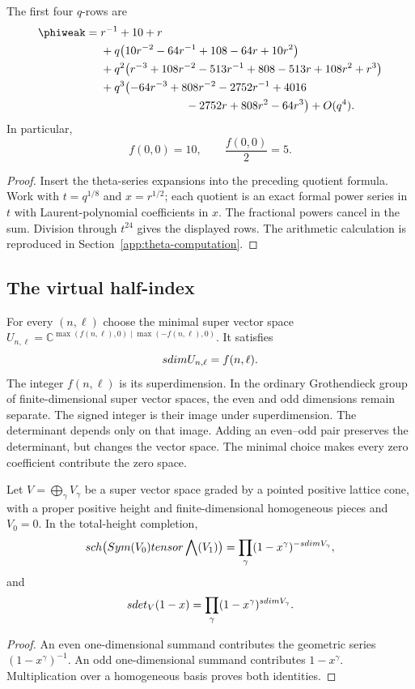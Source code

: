 \begin{theorem}
\label{comp:thm:jacobi-coefficients}
The first four $q$-rows are
\[
\begin{aligned}
\phiweak={}&r^{-1}+10+r\\
&+q\bigl(10r^{-2}-64r^{-1}+108-64r+10r^2\bigr)\\
&+q^2\bigl(r^{-3}+108r^{-2}-513r^{-1}+808-513r+108r^2+r^3\bigr)\\
&+q^3\bigl(-64r^{-3}+808r^{-2}-2752r^{-1}+4016\\
&\hspace{7.5em}{}-2752r+808r^2-64r^3\bigr)+O(q^4).
\end{aligned}
\]
In particular,
\[
 f(0,0)=10,
 \qquad \frac{f(0,0)}2=5.
\]
\end{theorem}
\begin{proof}
Insert the theta-series expansions into the preceding quotient formula. Work with $t=q^{1/8}$ and $x=r^{1/2}$; each quotient is an exact formal power series in $t$ with Laurent-polynomial coefficients in $x$. The fractional powers cancel in the sum. Division through $t^{24}$ gives the displayed rows. The arithmetic calculation is reproduced in Section~\ref{app:theta-computation}.
\end{proof}

\subsection{The virtual half-index}
For every $(n,\ell)$ choose the minimal super vector space
$U_{n,\ell}=\mathbb C^{\max(f(n,\ell),0)\mid\max(-f(n,\ell),0)}$. It satisfies
\[
 sdim U_{n,\ell}=f(n,\ell).
\]
The integer \(f(n,\ell)\) is its superdimension. In the ordinary
Grothendieck group of finite-dimensional super vector spaces, the
even and odd dimensions remain separate. The signed integer is their
image under superdimension. The determinant depends only on that image. Adding an even--odd pair
preserves the determinant, but changes the vector space. The minimal
choice makes every zero coefficient contribute the zero space.

\begin{lemma}
Let $V=\bigoplus_{\gamma}V_\gamma$ be a super vector space graded
by a pointed positive lattice cone, with a proper positive height and
finite-dimensional homogeneous pieces and $V_0=0$. In the total-height completion,
\[
 sch\bigl(Sym(V_{0})tensor\bigwedge(V_{1})\bigr)
 =\prod_\gamma(1-x^\gamma)^{-sdim V_\gamma},
\]
and
\[
 sdet_V(1-x)=\prod_\gamma(1-x^\gamma)^{sdim V_\gamma}.
\]
\end{lemma}
\begin{proof}
An even one-dimensional summand contributes the geometric series $(1-x^\gamma)^{-1}$. An odd one-dimensional summand contributes $1-x^\gamma$. Multiplication over a homogeneous basis proves both identities.
\end{proof}



